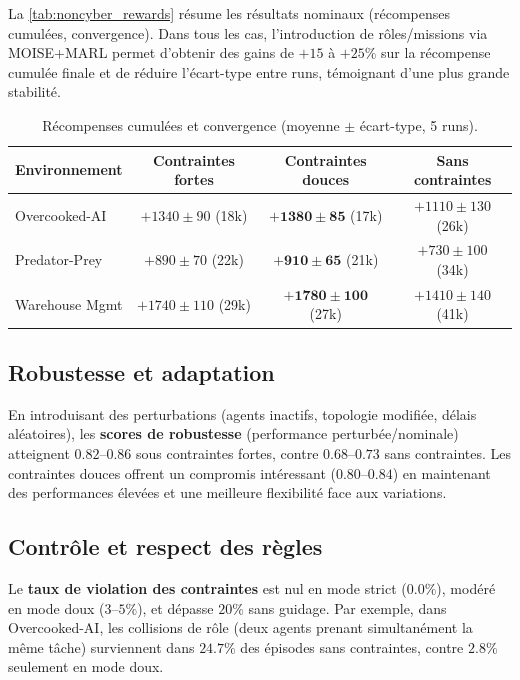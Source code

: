 La \autoref{tab:noncyber_rewards} résume les résultats nominaux (récompenses cumulées, convergence).
Dans tous les cas, l'introduction de rôles/missions via MOISE+MARL permet d'obtenir des gains de $+15$ à $+25\%$ sur la récompense cumulée finale et de réduire l'écart-type entre runs, témoignant d'une plus grande stabilité.

\begin{table}[h!]
  \centering
  \caption{Récompenses cumulées et convergence (moyenne $\pm$ écart-type, 5 runs).}
  \label{tab:noncyber_rewards}
  \renewcommand{\arraystretch}{1.2}
  \small
  \begin{tabular}{lccc}
    \hline
    \textbf{Environnement} & \textbf{Contraintes fortes} & \textbf{Contraintes douces}    & \textbf{Sans contraintes} \\
    \hline
    Overcooked-AI          & $+1340 \pm 90$ (18k)        & $\mathbf{+1380 \pm 85}$ (17k)  & $+1110 \pm 130$ (26k)     \\
    Predator-Prey          & $+890 \pm 70$ (22k)         & $\mathbf{+910 \pm 65}$ (21k)   & $+730 \pm 100$ (34k)      \\
    Warehouse Mgmt         & $+1740 \pm 110$ (29k)       & $\mathbf{+1780 \pm 100}$ (27k) & $+1410 \pm 140$ (41k)     \\
    \hline
  \end{tabular}
\end{table}

\subsection*{Robustesse et adaptation}

En introduisant des perturbations (agents inactifs, topologie modifiée, délais aléatoires), les \textbf{scores de robustesse} (performance perturbée/nominale) atteignent $0.82$–$0.86$ sous contraintes fortes, contre $0.68$–$0.73$ sans contraintes.
Les contraintes douces offrent un compromis intéressant ($0.80$–$0.84$) en maintenant des performances élevées et une meilleure flexibilité face aux variations.

\subsection*{Contrôle et respect des règles}

Le \textbf{taux de violation des contraintes} est nul en mode strict ($0.0\%$), modéré en mode doux ($3$–$5\%$), et dépasse $20\%$ sans guidage.
Par exemple, dans Overcooked-AI, les collisions de rôle (deux agents prenant simultanément la même tâche) surviennent dans $24.7\%$ des épisodes sans contraintes, contre $2.8\%$ seulement en mode doux.

